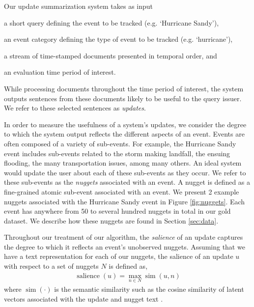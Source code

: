 \label{sec:methods}

Our update summarization system takes as input 
\begin{enumerate*}[label=\itshape\alph*\upshape)]
  \item a short query defining the event to be tracked 
  (e.g. `Hurricane Sandy'), 
  \item an event category defining the type of event to be tracked 
  (e.g. `hurricane'), 
  \item a stream of time-stamped documents presented in temporal order, 
  and \item an evaluation time period of interest.
\end{enumerate*} 
While processing documents throughout the time period of interest, the system 
outputs sentences from these documents likely to be useful to the query 
issuer.  We refer to these selected sentences as \emph{updates}.

In order to measure the usefulness of a system's updates, we consider the 
degree to which the system output reflects the different aspects of an event.
Events are often composed of a variety of sub-events.  For example, the 
Hurricane Sandy event includes sub-events related to the storm making 
landfall, the ensuing flooding, the many transportation issues, among many
others.  An ideal system would update the user about each of these
sub-events as they occur. We refer to these sub-events as the \emph{nuggets} 
associated with an event.  A nugget is defined as a fine-grained atomic 
sub-event associated with an event.  We present 2 example nuggets associated 
with the Hurricane Sandy event in Figure \ref{fig:nuggets}. Each event has 
anywhere from 50 to several hundred nuggets in total in our gold dataset.
We describe how these nuggets are found in Section \ref{sec:data}.





Throughout our treatment of our algorithm, the \emph{salience} of an update 
captures the degree to which it reflects an event's unobserved nuggets.  
Assuming that we have a text representation for each of our nuggets, the 
salience of an update $u$  with respect to a set of nuggets $N$ is defined as,
\begin{align}
\operatorname{salience}(u) = \operatorname{max}_{n \in N} 
\operatorname{sim}(u, n) \label{eq:salience}
\end{align}
where $\operatorname{sim}(\cdot)$ is the semantic similarity such as the 
cosine similarity of latent vectors associated with the update and nugget 
text \cite{guo2012simple}. 


